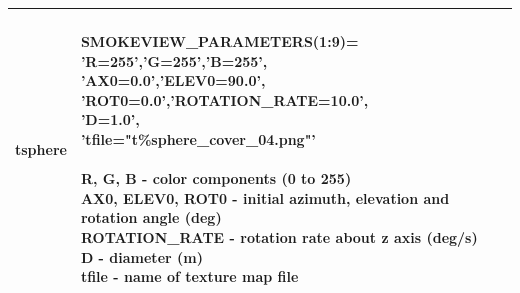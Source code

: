 \begin{longtable}[ht]{|l|l|c|}
{\ct tsphere} &
\parbox[c]{\boxwidth}{
\hspace{1in} \\
    {\ct SMOKEVIEW\_PARAMETERS(1:9)=}\\
    {\ct 'R=255','G=255','B=255',}\\
    {\ct 'AX0=0.0','ELEV0=90.0',}\\
    {\ct 'ROT0=0.0','ROTATION\_RATE=10.0',}\\
    {\ct 'D=1.0',}\\
    {\ct 'tfile="t\%sphere\_cover\_04.png"'}\\ \\
R, G, B - color components (0 to 255) \\
AX0, ELEV0, ROT0 - initial azimuth, elevation and rotation angle (deg) \\
ROTATION\_RATE - rotation rate about z axis (deg/s) \\
D - diameter (m) \\
tfile - name of texture map file \\
\hspace{1in}
} &
 \\ \hline


\end{longtable}
